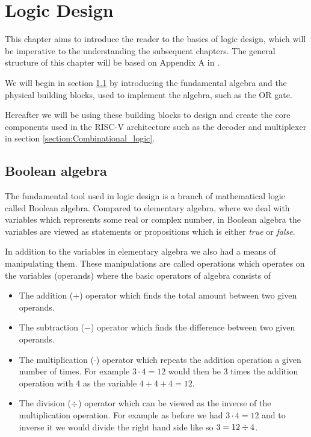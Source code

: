 \chapter{Logic Design}
    
    This chapter aims to introduce the reader to the basics of logic design, which will be imperative to the understanding the subsequent chapters. The general structure of this chapter will be based on Appendix A in \cite{riscVbook}. 
    
    We will begin in section \ref{section:Boolean_algebra} by introducing the fundamental algebra and the physical building blocks, used to implement the algebra, such as the OR gate. 
    
    Hereafter we will be using these building blocks to design and create the core components used in the RISC-V architecture such as the decoder and multiplexer in section \ref{section:Combinational_logic}. 

    \section{Boolean algebra}\label{section:Boolean_algebra}
    
        The fundamental tool used in logic design is a branch of mathematical logic called Boolean algebra. Compared to elementary algebra, where we deal with variables which represents some real or complex number, in Boolean algebra the variables are viewed as statements or propositions which is either \textit{true} or \textit{false}.
        
        In addition to the variables in elementary algebra we also had a means of manipulating them. These manipulations are called operations which operates on the variables (operands) where the basic operators of algebra consists of 
        
        \begin{itemize}
            \item The addition ($+$) operator which finds the total amount between two given operands.
            \item The subtraction ($-$) operator which finds the difference between two given operands.
            \item The multiplication ($\cdot$) operator which repeats the addition operation a given number of times.
                  For example $3 \cdot 4 = 12$ would then be 3 times the addition operation with 4 as the variable $4+4+4 = 12$.
            \item The division ($ \divisionsymbol $) operator which can be viewed as the inverse of the multiplication operation. For example as before we had $3 \cdot 4 = 12$ and to inverse it we would divide the right hand side like so $3 = 12 \divisionsymbol 4$.    
        \end{itemize}
        
